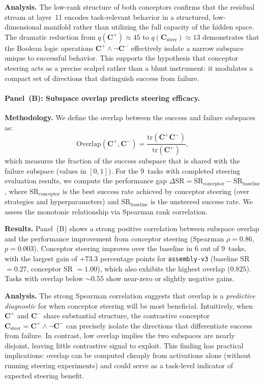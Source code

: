 \textbf{Analysis.}
The low-rank structure of both conceptors confirms that the residual stream at layer~11 encodes task-relevant behavior in a structured, low-dimensional manifold rather than utilizing the full capacity of the hidden space. The dramatic reduction from $q(\mathbf{C}^+) \approx 45$ to $q(\mathbf{C}_{\mathrm{steer}}) \approx 13$ demonstrates that the Boolean logic operations $\mathbf{C}^+ \wedge \lnot \mathbf{C}^-$ effectively isolate a narrow subspace unique to successful behavior. This supports the hypothesis that conceptor steering acts as a precise scalpel rather than a blunt instrument: it modulates a compact set of directions that distinguish success from failure.

\paragraph{Panel~(B): Subspace overlap predicts steering efficacy.}

\textbf{Methodology.}
We define the overlap between the success and failure subspaces as:
\begin{equation}
    \mathrm{Overlap}(\mathbf{C}^+, \mathbf{C}^-) = \frac{\mathrm{tr}(\mathbf{C}^+ \mathbf{C}^-)}{\mathrm{tr}(\mathbf{C}^+)},
\end{equation}
which measures the fraction of the success subspace that is shared with the failure subspace (values in $[0,1]$). For the 9~tasks with completed steering evaluation results, we compute the performance gap $\Delta\mathrm{SR} = \mathrm{SR}_{\mathrm{conceptor}} - \mathrm{SR}_{\mathrm{baseline}}$, where $\mathrm{SR}_{\mathrm{conceptor}}$ is the best success rate achieved by conceptor steering (over strategies and hyperparameters) and $\mathrm{SR}_{\mathrm{baseline}}$ is the unsteered success rate. We assess the monotonic relationship via Spearman rank correlation.

\textbf{Results.}
Panel~(B) shows a strong positive correlation between subspace overlap and the performance improvement from conceptor steering (Spearman $\rho = 0.86$, $p = 0.003$). Conceptor steering improves over the baseline in 6 out of 9~tasks, with the largest gain of $+73.3$ percentage points for \texttt{assembly-v3} (baseline SR $= 0.27$, conceptor SR $= 1.00$), which also exhibits the highest overlap ($0.825$). Tasks with overlap below ${\sim}0.55$ show near-zero or slightly negative gains.

\textbf{Analysis.}
The strong Spearman correlation suggests that overlap is a \emph{predictive diagnostic} for when conceptor steering will be most beneficial. Intuitively, when $\mathbf{C}^+$ and $\mathbf{C}^-$ share substantial structure, the contrastive conceptor $\mathbf{C}_{\mathrm{steer}} = \mathbf{C}^+ \wedge \lnot \mathbf{C}^-$ can precisely isolate the directions that differentiate success from failure. In contrast, low overlap implies the two subspaces are nearly disjoint, leaving little contrastive signal to exploit. This finding has practical implications: overlap can be computed cheaply from activations alone (without running steering experiments) and could serve as a task-level indicator of expected steering benefit.

